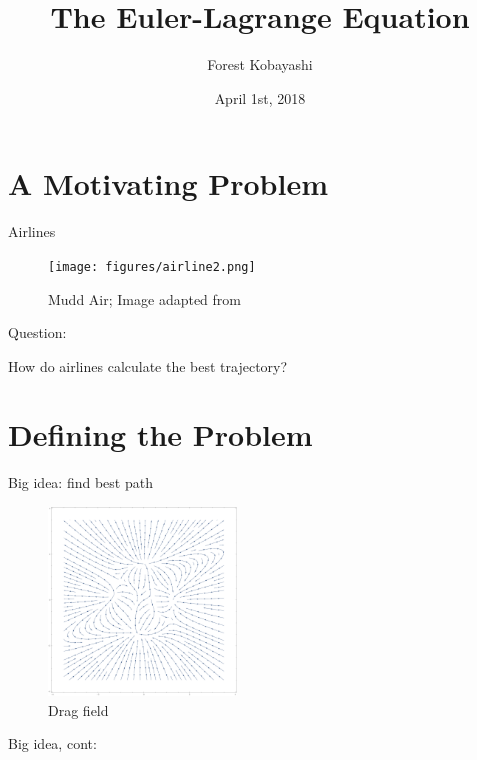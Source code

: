 \documentclass{fkpresentation}
\title{\textmd{The Euler-Lagrange Equation}}
\author{Forest Kobayashi}
\institute{Harvey Mudd College}
\date{April 1st, 2018}
\begin{document}
\frame{\titlepage}
\section{A Motivating Problem}

\begin{frame}{Airlines}
  \begin{figure}[h]
    \centering
    \texttt{[image: figures/airline2.png]}
    \caption{Mudd Air; Image adapted from \cite{Airplane}}
  \end{figure}
\end{frame}



\begin{frame}{Question:}
  \begin{center}
    \Huge
    How do airlines calculate the best trajectory?
  \end{center}
\end{frame}

\section{Defining the Problem}

\begin{frame}{Big idea: find best path}
  \begin{figure}[h]
    \centering
    \includegraphics[keepaspectratio,height=5cm]{figures/vector-field.pdf}
    \caption{Drag field}
    \label{fig:wind}
  \end{figure}
\end{frame}

\begin{frame}{Big idea, cont:}
  \begin{figure}[h]
    \vfill
    \centering
    \vfill
  \end{figure}
\end{frame}
\end{document}
